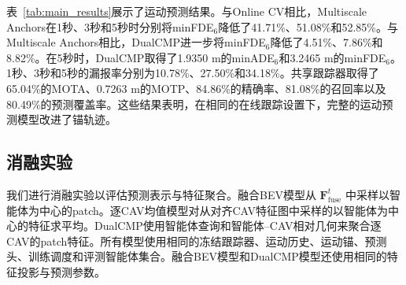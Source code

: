 \documentclass[lettersize,journal]{IEEEtran}
\begin{document}
\begin{table}[t]
\centering
\caption{V2V4Real测试集上严格在线设置下的运动预测结果。ADE和FDE以米为单位。所有方法使用相同的在线跟踪结果和评测智能体集合。}
\label{tab:main_results}
\end{table}

表~\ref{tab:main_results}展示了运动预测结果。与Online CV相比，Multiscale Anchors在1秒、3秒和5秒时分别将minFDE$_6$降低了41.71\%、51.08\%和52.85\%。与Multiscale Anchors相比，DualCMP进一步将minFDE$_6$降低了4.51\%、7.86\%和8.82\%。在5秒时，DualCMP取得了1.9350 m的minADE$_6$和3.2465 m的minFDE$_6$。1秒、3秒和5秒的漏报率分别为10.78\%、27.50\%和34.18\%。共享跟踪器取得了65.04\%的MOTA、0.7263 m的MOTP、84.86\%的精确率、81.08\%的召回率以及80.49\%的预测覆盖率。这些结果表明，在相同的在线跟踪设置下，完整的运动预测模型改进了锚轨迹。

\subsection{消融实验}

我们进行消融实验以评估预测表示与特征聚合。融合BEV模型从 \(\mathbf{F}_{\mathrm{fuse}}^t\) 中采样以智能体为中心的patch。逐CAV均值模型对从对齐CAV特征图中采样的以智能体为中心的特征求平均。DualCMP使用智能体查询和智能体--CAV相对几何来聚合逐CAV的patch特征。所有模型使用相同的冻结跟踪器、运动历史、运动锚、预测头、训练调度和评测智能体集合。融合BEV模型和DualCMP模型还使用相同的特征投影与预测参数。

\begin{table}[t]
\centering
\caption{预测表示与特征聚合的消融实验。最后三列分别报告仅接收端可见、仅伙伴端可见和共享智能体的5秒minFDE$_6$。所有模型使用相同的跟踪器和评测智能体集合。}
\label{tab:representation_ablation}
\end{table}
\end{document}
